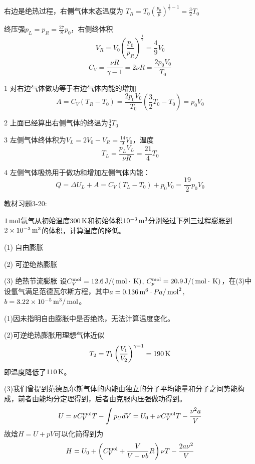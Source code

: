\documentclass[CJK]{beamer}
\begin{document}
\begin{frame}
  \bch
  {\scriptsize
    右边是绝热过程，右侧气体末态温度为
    $T_R = T_0\left(\frac{p_0}{p}\right)^{\frac{1}{\gamma}-1} = \frac{3}{2}T_0$
    
    终压强$p_L=p_R=\frac{27}{8}p_0$，右侧终体积
    $$V_R = V_0\left(\frac{p_0}{p_R}\right)^{\frac{1}{\gamma}} = \frac{4}{9}V_0$$
    $$C_V = \frac{\nu R}{\gamma - 1} = 2 \nu R = \frac{2p_0V_0}{T_0}$$
  
    \bitem
  \item[1]{对右边气体做功等于右边气体内能的增加
    $$A = C_V(T_R-T_0) = \frac{2p_0V_0}{T_0}\left(\frac{3}{2}T_0-T_0\right) = p_0V_0$$}
  \item[2]{上面已经算出右侧气体的终温为$\frac{3}{2}T_0$}
  \item[3]{左侧气体终体积为$V_L=2V_0-V_R = \frac{14}{9}V_0$，温度
    $$T_L = \frac{p_LV_L}{\nu R} = \frac{21}{4}T_0$$}
  \item[4]{左侧气体吸热用于做功和增加左侧气体内能：
    $$ Q = \Delta U_L + A = C_V(T_L-T_0) + p_0V_0 = \frac{19}{2}p_0V_0$$}
    \eitem
  }
  \ech
\end{frame}

\begin{frame}
  \chtitle{\proid (\sthree)}
  \bch
  教材习题3-20:

  $1\,\mathrm{mol}$氩气从初始温度$300\,\mathrm{K}$和初始体积$10^{-3}\,\mathrm{m}^3$分别经过下列三过程膨胀到$2\times 10^{-3}\,\mathrm{m}^3$的体积，计算温度的降低。
  \bitem
\item[(1)]{自由膨胀}
\item[(2)]{可逆绝热膨胀}
\item[(3)]{绝热节流膨胀}
  \eitem
  设$C_V^{\rm mol} = 12.6\,\mathrm{J}/(\,\mathrm{mol}\cdot\,\mathrm{K})$, $C_p^{\rm mol} = 20.9\,\mathrm{J}/(\,\mathrm{mol}\cdot\,\mathrm{K})$，在(3)中设氩气满足范德瓦尔斯方程，其中$a = 0.136\,\mathrm{m}^6\cdot Pa/\,\mathrm{mol}^2$, $b =3.22\times 10^{-5}\,\mathrm{m}^3/\,\mathrm{mol}$。
  \ech
\end{frame}


\begin{frame}
  \bch
  {\small
    (1)因未指明自由膨胀中是否绝热，无法计算温度变化。
    
    (2)可逆绝热膨胀用理想气体近似
  $$T_2 = T_1 \left(\frac{V_1}{V_2}\right)^{\gamma-1} = 190 \,\mathrm{K} $$
    即温度降低了$110\,\mathrm{K}$。
    
    (3)我们曾提到范德瓦尔斯气体的内能由独立的分子平均能量和分子之间势能构成，前者由能均分定理得到，后者由克服内压强做功得到。
    $$ U = \nu C_V^{\rm mol}T - \int p_U dV = U_0 + \nu C_V^{\rm mol}T - \frac{\nu^2 a}{V}$$
    故焓$H= U +pV$可以化简得到为
    $$ H  = U_0 + \left(C_V^{\rm mol} + \frac{V}{V-\nu b}R\right) \nu T -\frac{2a\nu^2}{V}$$
  }
  \ech
\end{frame}
\end{document}

